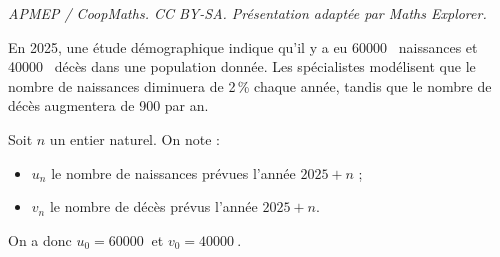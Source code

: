 \documentclass[10pt]{article}
\providecommand{\np}[2][]{{#2~#1}}
\begin{document}
\noindent\textit{APMEP / CoopMaths. CC BY-SA. Présentation adaptée par Maths Explorer.}\par\medskip
En 2025, une étude démographique indique qu'il y a eu \np{60000} naissances et \np{40000} décès dans une population donnée. Les spécialistes modélisent que le nombre de naissances diminuera de 2\,\% chaque année, tandis que le nombre de décès augmentera de 900 par an.

\medskip

Soit $n$ un entier naturel. On note :
\begin{itemize}[left=5mm]
	\item $u_{n}$ le nombre de naissances prévues l'année $2025+n$ ;
	\item $v_{n}$ le nombre de décès prévus l'année $2025+n$.
\end{itemize}

On a donc $u_{0}=\np{60000}$ et $v_{0}=\np{40000}$.
\end{document}
